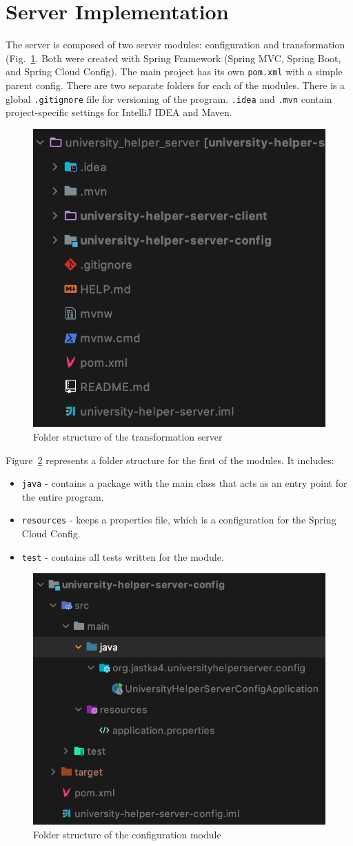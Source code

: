 \section{Server Implementation}
The server is composed of two server modules: configuration and transformation (Fig.~\ref{fig:server-folder-structure}. Both were created with Spring Framework (Spring MVC, Spring Boot, and Spring Cloud Config). The main project has its own \texttt{pom.xml} with a simple parent config. There are two separate folders for each of the modules. There is a global \texttt{.gitignore} file for versioning of the program. \texttt{.idea} and \texttt{.mvn} contain project-specific settings for IntelliJ IDEA and Maven.

\begin{figure}[htb]
    \centering
    \includegraphics[width=.4\linewidth]{fig04/server-folder-structure.png}
    \caption{Folder structure of the transformation server}
    \label{fig:server-folder-structure}
\end{figure}

Figure~\ref{fig:server-config-folder-structure} represents a folder structure for the first of the modules. It includes:
\begin{itemize}
    \item \texttt{java} - contains a package with the main class that acts as an entry point for the entire program.
    \item \texttt{resources} - keeps a properties file, which is a configuration for the Spring Cloud Config.
    \item \texttt{test} - contains all tests written for the module.
\end{itemize}

\begin{figure}[htb]
    \centering
    \includegraphics[width=.4\linewidth]{fig04/server-config-folder-structure.png}
    \caption{Folder structure of the configuration module}
    \label{fig:server-config-folder-structure}
\end{figure}

